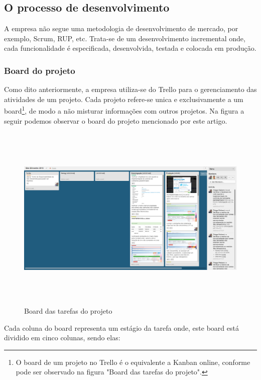 \documentclass[11pt, a4paper]{article}
\begin{document}
\subsection{O processo de desenvolvimento}
A empresa não segue uma metodologia de desenvolvimento de mercado, por exemplo, Scrum, RUP, etc. Trata-se de um desenvolvimento incremental onde, cada funcionalidade é especificada, desenvolvida, testada e colocada em produção.

\subsubsection{Board do projeto}

Como dito anteriormente, a empresa utiliza-se do Trello para o gerenciamento das atividades de um projeto. Cada projeto refere-se unica e exclusivamente a um board\footnote{O board de um projeto no Trello é o equivalente a Kanban online, conforme pode ser observado na figura "Board das tarefas do projeto".}, de modo a não misturar informações com outros projetos. Na figura a seguir podemos observar o board do projeto mencionado por este artigo.

\begin{figure}[H]
  \caption{Board das tarefas do projeto}
  \centering 
  \includegraphics[width=160mm,height=90mm]{images/board.png}
\end{figure}

Cada coluna do board representa um estágio da tarefa onde, este board está dividido em cinco colunas, sendo elas:
\end{document}
